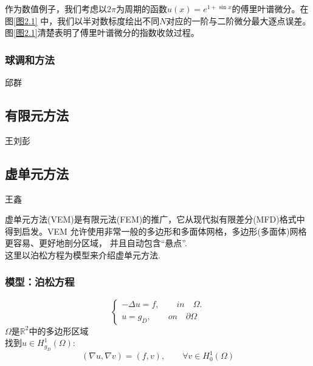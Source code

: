     作为数值例子，我们考虑以$2\pi$为周期的函数$u(x) = e^{1 + \sin x}$的傅里叶谱微分。在图\ref{图2.1} 中，我们以半对数标度绘出不同$N$对应的一阶与二阶微分最大逐点误差。图\ref{图2.1}清楚表明了傅里叶谱微分的指数收敛过程。

\subsubsection{球调和方法}

{\color{red}\begin{center}
     邱群
\end{center}}


\subsection{有限元方法}

{\color{red}\begin{center}
     王刘彭
\end{center}}


\subsection{虚单元方法}
{\color{red}\begin{center}
    王鑫
\end{center}}

虚单元方法(VEM)是有限元法(FEM)的推广，它从现代拟有限差分(MFD)格式中得到启发。VEM
允许使用非常一般的多边形和多面体网格，多边形(多面体)网格更容易、更好地剖分区域，
并且自动包含“悬点”.\\

这里以泊松方程为模型来介绍虚单元方法.\\

  \subsubsection{模型：泊松方程}
    
     \begin{equation}\label{eq:dirichlet}
     \begin{cases}
     -\Delta u =f,\qquad  in\quad \Omega.\\
     u=g_D,\qquad on \quad\partial \Omega 
     \end{cases}
     \end{equation}
     $\Omega $是$\mathbb{R}^2$中的多边形区域\\
     
     找到$ u \in H_{g_D}^{1}(\Omega)$:
     \begin{equation}
     (\nabla u,\nabla v)=(f,v) ,\qquad \forall v \in H_0^1(\Omega)
     \end{equation}
     
